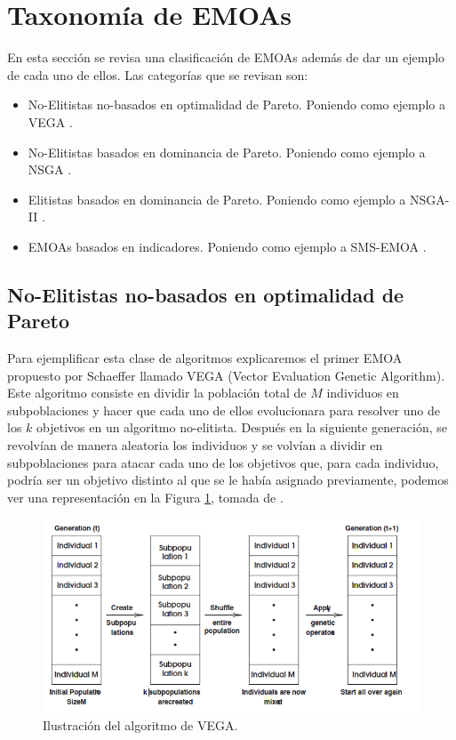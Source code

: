 \section{Taxonomía de EMOAs} \label{sec:QIs_tax}

En esta sección se revisa una clasificación de EMOAs además de dar un ejemplo de cada uno de ellos. Las categorías que se revisan son: 

\begin{itemize}
\item No-Elitistas no-basados en optimalidad de Pareto. Poniendo como ejemplo a VEGA \cite{schafferMultipleObjectiveOptimization1984}.
\item No-Elitistas basados en dominancia de Pareto. Poniendo como ejemplo a NSGA \cite{debFastElitistNondominated2000}.
\item Elitistas basados en dominancia de Pareto. Poniendo como ejemplo a NSGA-II \cite{seifbarghyNovelMetaheuristicAlgorithm2016}.
\item EMOAs basados en indicadores. Poniendo como ejemplo a SMS-EMOA \cite{SMS-EMOA}.
\end{itemize}


\subsection*{No-Elitistas no-basados en optimalidad de Pareto} \label{sec:VEGA}

Para ejemplificar esta clase de algoritmos explicaremos el primer EMOA propuesto por Schaeffer \cite{schafferMultipleObjectiveOptimization1984} llamado VEGA (Vector Evaluation Genetic Algorithm). Este algoritmo consiste en dividir la población total de $M$ individuos en subpoblaciones y hacer que cada uno de ellos evolucionara para resolver uno de los $k$ objetivos en un algoritmo no-elitista. Después en la siguiente generación, se revolvían de manera aleatoria los individuos y se volvían a dividir en subpoblaciones para atacar cada uno de los objetivos que, para cada individuo, podría ser un objetivo distinto al que se le había asignado previamente, podemos ver una representación en la Figura \ref{fig:VEGA}, tomada de \cite{coelloEvolutionaryAlgorithmsSolving}.

\begin{figure}[H]
    \centering
    \includegraphics[width=\textwidth]{Figuras/vega.png}
    \caption[VEGA]{Ilustración del algoritmo de VEGA.}
    \label{fig:VEGA}
\end{figure}

